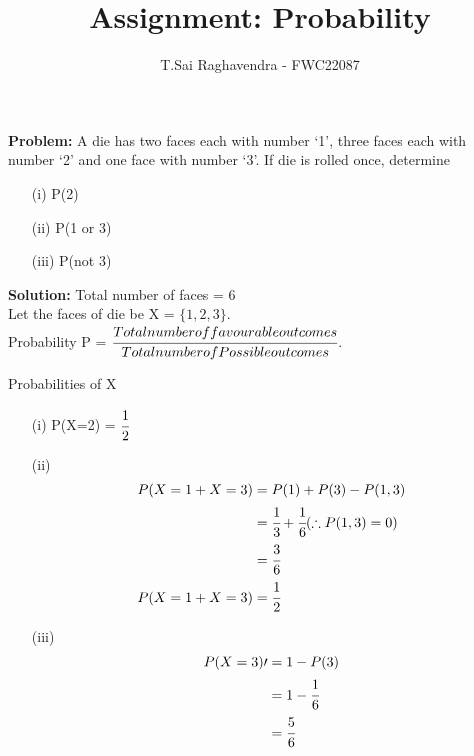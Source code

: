 \documentclass{article}
\newcommand{\Problem}{\noindent \textbf{Problem: }}
\newcommand{\solution}{\noindent \textbf{Solution: }}
\begin{document}
\title{Assignment: Probability}
\author{\Large T.Sai Raghavendra - FWC22087}
\date{}


\maketitle

\Problem A die has two faces each with number ‘1’, three faces each with number ‘2’ and
one face with number ‘3’. If die is rolled once, determine
\begin{enumerate}
\item[(i)] P(2)
\item[(ii)] P(1 or 3)
\item[(iii)] P(not 3)
\end{enumerate}

\solution
Total number of faces = 6\\
Let the faces of die be X = $\{1,2,3\}$.\\
Probability P = $\cfrac{Total number of favourable outcomes}{Total number of Possible outcomes}$.

	\begin{table}[h!]
	\small
	\centering
	
	\caption{Probabilities of X}
	\label{tables:table1}
	\end{table}

\begin{enumerate}
\item[(i)] P(X=2) = $\cfrac{1}{2}$\\  %
	
\item[(ii)] \begin{align}
P(X=1 + X=3)	=& \; P(1) + P(3) - P(1,3)\\
				=& \; \cfrac{1}{3} + \cfrac{1}{6}   (\therefore P(1,3) = 0)\\
				=& \; \cfrac{3}{6}\\
P(X=1 + X=3) 	=& \; \cfrac{1}{2}
\end{align}

\item[(iii)] \begin{align}
P(X=3)\prime =& \; 1 - P(3)\\
			 =& \; 1 - \cfrac{1}{6}\\
			 =& \; \cfrac{5}{6}
\end{align}
\end{enumerate}
\end{document}
